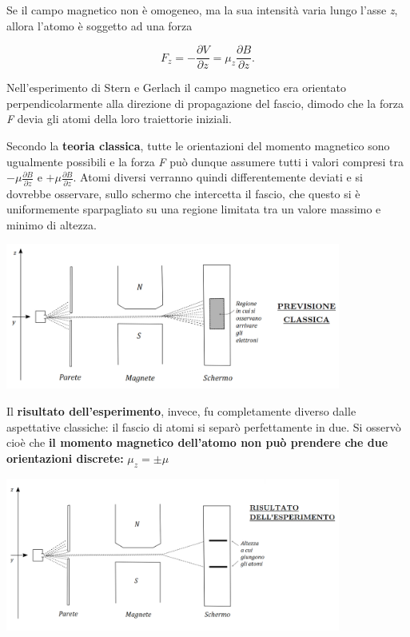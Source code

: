 \documentclass[a4paper,12pt,oneside]{book}
\begin{document}
Se il campo magnetico non è omogeneo, ma la sua intensità varia lungo l'asse \emph{z}, allora l'atomo è soggetto ad una forza

\begin{equation}
F_z= - \frac{\partial V}{\partial z}= \mu_z\frac{\partial B}{\partial z} .
\end{equation}

Nell'esperimento di Stern e Gerlach il campo magnetico era orientato perpendicolarmente alla direzione di propagazione del fascio, dimodo che la forza \emph{F} devia gli atomi della loro traiettorie iniziali.

Secondo la \textbf{teoria classica}, tutte le orientazioni del momento magnetico sono ugualmente possibili e la forza \emph{F} può dunque assumere tutti i valori compresi tra $-\mu \frac{\partial B}{\partial z}$ e $+\mu \frac{\partial B}{\partial z}$. Atomi diversi verranno quindi differentemente deviati e si dovrebbe osservare, sullo schermo che intercetta il fascio, che questo si è uniformemente sparpagliato su una regione limitata tra un valore massimo e minimo di altezza.
\begin{center}
\includegraphics[width=11cm]{immagini/cap_3/fig_3_1.png}
\end{center}

Il \textbf{risultato dell'esperimento}, invece, fu completamente diverso dalle aspettative classiche: il fascio di atomi si separò perfettamente in due. Si osservò cioè che \textbf{il momento magnetico dell'atomo non può prendere che due orientazioni discrete:} $\mu_z=\pm \mu $ \\
\begin{center}
\includegraphics[width=11cm]{immagini/cap_3/fig_3_2.png}
\end{center}
\end{document}
